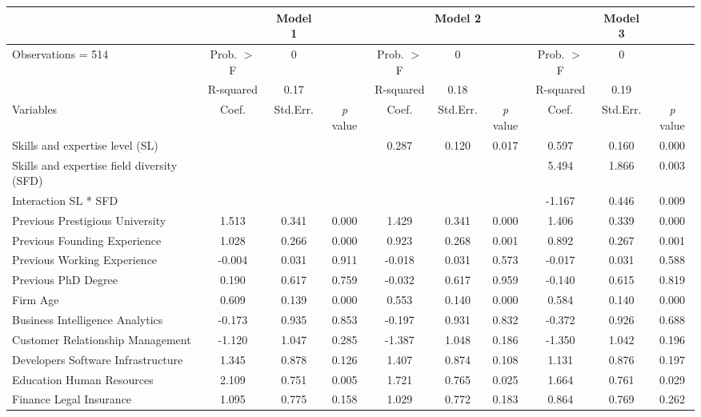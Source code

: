 \documentclass[12pt]{article}
\begin{document}
\begin{table} [ht]
\centering
  \tiny
  \begin{tabular}{lccccccccc}
    \toprule
      & & \multicolumn{1}{c}{\textbf{Model 1}} & \multicolumn{5}{c}{\textbf{Model 2}} & \multicolumn{1}{c}{\textbf{Model 3}} & \\
    \hline
      Observations = 514 & Prob. $>$ F & 0 & & Prob. $>$ F & 0 & & Prob. $>$ F & 0 & \\
       & R-squared & 0.17 & & R-squared & 0.18 & & R-squared & 0.19 & \\
    \hline
      Variables & Coef. & Std.Err. & \textit{p} value & Coef. & Std.Err. & \textit{p} value & Coef. & Std.Err. & \textit{p} value \\
    \hline
      Skills and expertise level (SL) & & & & 0.287 & 0.120 & 0.017 & 0.597 & 0.160 & 0.000 \\
      Skills and expertise field diversity (SFD) & & & & & & & 5.494 & 1.866 & 0.003 \\
      Interaction SL * SFD & & & & & & & -1.167 & 0.446 & 0.009 \\
      Previous Prestigious University & 1.513 & 0.341 & 0.000 & 1.429 & 0.341 & 0.000 & 1.406 & 0.339 & 0.000 \\
      Previous Founding Experience & 1.028 & 0.266 & 0.000 & 0.923 & 0.268 & 0.001 & 0.892 & 0.267 & 0.001 \\
      Previous Working Experience & -0.004 & 0.031 & 0.911 & -0.018 & 0.031 & 0.573 & -0.017 & 0.031 & 0.588 \\
      Previous PhD Degree & 0.190 & 0.617 & 0.759 & -0.032 & 0.617 & 0.959 & -0.140 & 0.615 & 0.819 \\
      Firm Age & 0.609 & 0.139 & 0.000 & 0.553 & 0.140 & 0.000 & 0.584 & 0.140 & 0.000 \\
      Business Intelligence Analytics & -0.173 & 0.935 & 0.853 & -0.197 & 0.931 & 0.832 & -0.372 & 0.926 & 0.688 \\
      Customer Relationship Management & -1.120 & 1.047 & 0.285 & -1.387 & 1.048 & 0.186 & -1.350 & 1.042 & 0.196 \\
      Developers Software Infrastructure & 1.345 & 0.878 & 0.126 & 1.407 & 0.874 & 0.108 & 1.131 & 0.876 & 0.197 \\
      Education Human Resources & 2.109 & 0.751 & 0.005 & 1.721 & 0.765 & 0.025 &  1.664 & 0.761 & 0.029 \\
      Finance Legal Insurance & 1.095 & 0.775 & 0.158 & 1.029 & 0.772 & 0.183 & 0.864 & 0.769 & 0.262 \\

\end{tabular}
\end{table}
\end{document}
